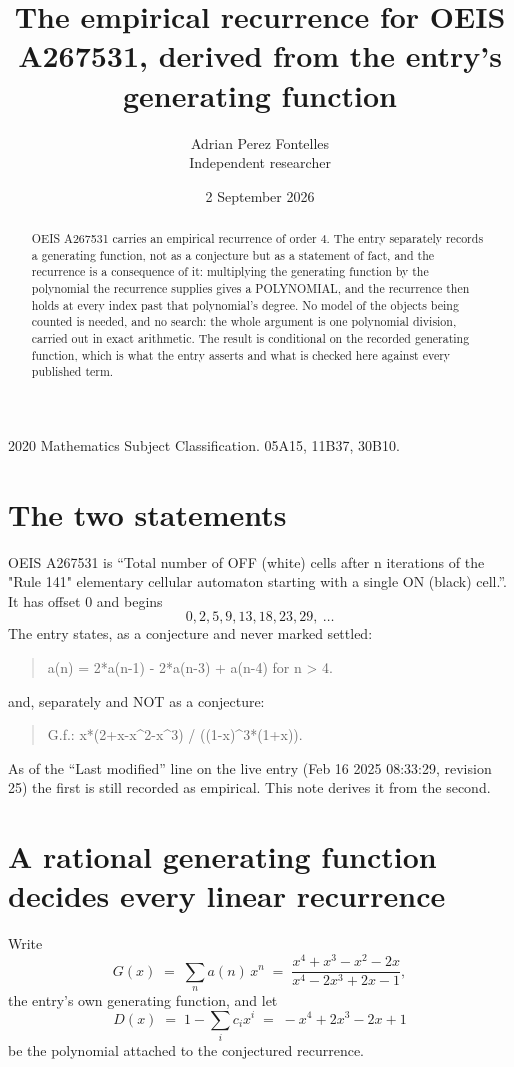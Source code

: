 \documentclass[11pt,a4paper]{article}
\title{The empirical recurrence for OEIS A267531, derived from the entry's generating function}
\author{Adrian Perez Fontelles\\ \small Independent researcher}
\date{2 September 2026}
\theoremstyle{plain}
\theoremstyle{definition}
\begin{document}
\maketitle

\begin{abstract}
OEIS A267531 carries an empirical recurrence of order $4$. The entry separately records a
generating function, not as a conjecture but as a statement of fact, and the recurrence is a
consequence of it: multiplying the generating function by the polynomial the recurrence
supplies gives a POLYNOMIAL, and the recurrence then holds at every index past that
polynomial's degree. No model of the objects being counted is needed, and no search: the
whole argument is one polynomial division, carried out in exact arithmetic. The result is
conditional on the recorded generating function, which is what the entry asserts and what is
checked here against every published term.
\end{abstract}

\noindent\small 2020 Mathematics Subject Classification. 05A15, 11B37, 30B10.\normalsize

\section{The two statements}

OEIS A267531 is ``Total number of OFF (white) cells after n iterations of the "Rule 141" elementary cellular automaton starting with a single ON (black) cell.''. It has offset $0$ and begins
\[
0, 2, 5, 9, 13, 18, 23, 29,\ \dots
\]
The entry states, as a conjecture and never marked settled:
\begin{quote}
a(n) = 2*a(n-1) - 2*a(n-3) + a(n-4) for n > 4.
\end{quote}
and, separately and NOT as a conjecture:
\begin{quote}
G.f.: x*(2+x-x\^{}2-x\^{}3) / ((1-x)\^{}3*(1+x)).
\end{quote}
As of the ``Last modified'' line on the live entry (Feb 16 2025 08:33:29, revision 25) the first is still
recorded as empirical. This note derives it from the second.

\section{A rational generating function decides every linear recurrence}

Write
\[
G(x)\;=\;\sum_{n}a(n)\,x^{n}\;=\;\frac{x^{4} + x^{3} - x^{2} - 2 x}{x^{4} - 2 x^{3} + 2 x - 1},
\]
the entry's own generating function, and let
\[
D(x)\;=\;1-\sum_i c_i x^{i}\;=\;- x^{4} + 2 x^{3} - 2 x + 1
\]
be the polynomial attached to the conjectured recurrence.
\end{document}

